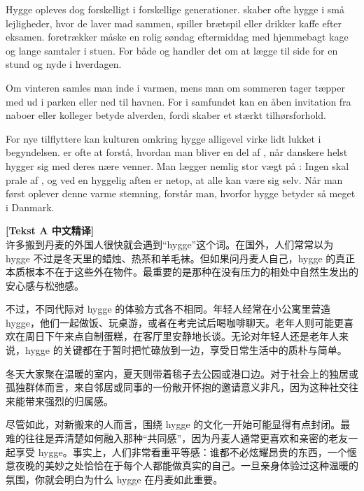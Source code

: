 Hygge opleves dog forskelligt i forskellige generationer.  skaber ofte hygge i små lejligheder, hvor de laver mad sammen, spiller brætspil eller drikker kaffe efter eksamen.  foretrækker måske en rolig søndag eftermiddag med hjemmebagt kage og lange samtaler i stuen. For både  og  handler det om at lægge  til side for en stund og nyde  i hverdagen.

Om vinteren samles man inde i varmen, mens man om sommeren tager tæpper med ud i parken eller ned til havnen. For  i samfundet kan en åben invitation fra naboer eller kolleger betyde alverden, fordi  skaber et stærkt tilhørsforhold.

For nye tilflyttere kan kulturen omkring hygge alligevel virke lidt lukket i begyndelsen.  er ofte at forstå, hvordan man bliver en del af , når danskere helst hygger sig med deres nære venner. Man lægger nemlig stor vægt på : Ingen skal prale af , og  ved en hyggelig aften er netop, at alle kan være sig selv. Når man først oplever denne varme stemning, forstår man, hvorfor hygge betyder så meget i Danmark.

\begin{transbox}
\small
\textbf{\color{NCDTeal}[Tekst A 中文精译]}\\
许多搬到丹麦的外国人很快就会遇到“hygge”这个词。在国外，人们常常以为 hygge 不过是冬天里的蜡烛、热茶和羊毛袜。但如果问丹麦人自己，hygge 的真正本质根本不在于这些外在物件。最重要的是那种在没有压力的相处中自然生发出的安心感与松弛感。

不过，不同代际对 hygge 的体验方式各不相同。年轻人经常在小公寓里营造 hygge，他们一起做饭、玩桌游，或者在考完试后喝咖啡聊天。老年人则可能更喜欢在周日下午来点自制蛋糕，在客厅里安静地长谈。无论对年轻人还是老年人来说，hygge 的关键都在于暂时把忙碌放到一边，享受日常生活中的质朴与简单。

冬天大家聚在温暖的室内，夏天则带着毯子去公园或港口边。对于社会上的独居或孤独群体而言，来自邻居或同事的一份敞开怀抱的邀请意义非凡，因为这种社交往来能带来强烈的归属感。

尽管如此，对新搬来的人而言，围绕 hygge 的文化一开始可能显得有点封闭。最难的往往是弄清楚如何融入那种“共同感”，因为丹麦人通常更喜欢和亲密的老友一起享受 hygge。事实上，人们非常看重平等感：谁都不必炫耀昂贵的东西，一个惬意夜晚的美妙之处恰恰在于每个人都能做真实的自己。一旦亲身体验过这种温暖的氛围，你就会明白为什么 hygge 在丹麦如此重要。
\end{transbox}

